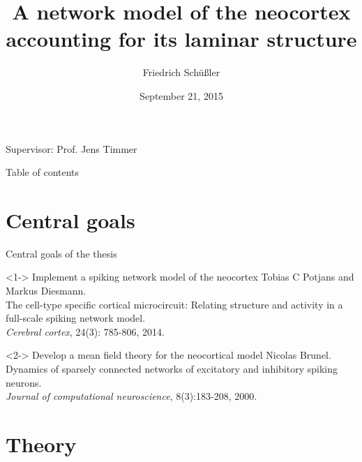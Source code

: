 \documentclass[xcolor=x11names,compress]{beamer}
\renewcommand{\(}{\begin{columns}}
\renewcommand{\)}{\end{columns}}
\newcommand{\<}[1]{\begin{column}{#1}}
\renewcommand{\>}{\end{column}}
\begin{document}
\begin{frame}{}
\title[Neocortex]{A network model of the neocortex accounting for its laminar structure}
\author{
Friedrich Schüßler}
\date{\normalsize September 21, 2015}
\titlepage

\centering 
Supervisor: Prof. Jens Timmer
\end{frame}

\begin{frame}{Table of contents}
    \tableofcontents
\end{frame}


\section{Central goals}

\begin{frame}[J]{Central goals of the thesis}
    \begin{block}<1->
        {Implement a spiking network model of the neocortex}
        \vspace{0.2cm}
        \footnotesize
        Tobias C Potjans and Markus Diesmann. \\
        The cell-type specific cortical microcircuit:
        Relating structure and activity in a full-scale spiking network model. \\
        \textit{Cerebral cortex}, 24(3): 785-806, 2014.
    \end{block}
    \vfill
    \begin{block}<2->
        {Develop a mean field theory for the neocortical model}
        \vspace{0.2cm}
        \footnotesize
        Nicolas Brunel. \\
        Dynamics of sparsely connected networks of excitatory and inhibitory spiking 
        neurons. \\
        \textit{Journal of computational neuroscience}, 8(3):183-208, 2000.
    \end{block}
\end{frame}


\section{Theory}
\label{sec:theory}
\end{document}
